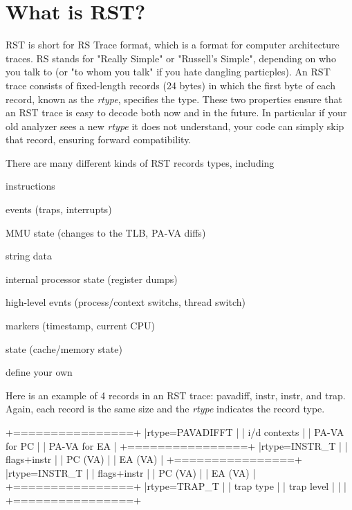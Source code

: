\documentclass[10pt]{article}
\begin{document}
\section{What is RST?}

RST is short for RS Trace format, which is a format for computer
architecture traces.  RS stands for "Really Simple" or "Russell's Simple",
depending on who you talk to (or "to whom you talk" if you hate dangling
particples).  An RST trace consists of fixed-length records (24 bytes)
in which the first byte of each record, known as the \textsl{rtype},
specifies the type.  These two properties ensure that an RST trace is
easy to decode both now and in the future.  In particular if your old
analyzer sees a new \textsl{rtype} it does not understand, your code can
simply skip that record, ensuring forward compatibility.

There are many different kinds of RST records types, including
\begin{rqitemize}{0em}
  \item instructions
  \item events (traps, interrupts)
  \item MMU state (changes to the TLB, PA-VA diffs)
  \item string data
  \item internal processor state (register dumps)
  \item high-level evnts (process/context switchs, thread switch)
  \item markers (timestamp, current CPU) 
  \item state (cache/memory state)
  \item define your own
\end{rqitemize}

Here is an example of 4 records in an RST trace: pavadiff, instr, instr,
and trap.  Again, each record is the same size and the \textsl{rtype}
indicates the record type.

\begin{rqcode}{\small}
   +================+
   |rtype=PAVADIFFT |
   | i/d contexts   |
   | PA-VA for PC   |
   | PA-VA for EA   |
   +================+
   |rtype=INSTR\_T   |
   | flags+instr    |
   | PC (VA)        |
   | EA (VA)        |
   +================+
   |rtype=INSTR\_T   |
   | flags+instr    |
   | PC (VA)        |
   | EA (VA)        |
   +================+
   |rtype=TRAP\_T    |
   | trap type      |
   | trap level     |
   |                |
   +================+
\end{rqcode}
\end{document}
